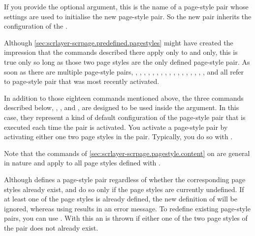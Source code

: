 If you provide the optional  argument, this is the name of
a page-style pair whose settings are used to initialise the new page-style
pair. So the new pair inherits the configuration of the .

Although \autoref{sec:scrlayer-scrpage.predefined.pagestyles} might have
created the impression that the commands described there apply only to
 and  only, this is true
only so long as those two page styles are the only defined page-style pair. As
soon as there are multiple page-style pairs,
, ,
, ,
, ,
, ,
, ,
, ,
, ,
, ,
, and 
all refer to page-style pair that was most recently activated.

In addition to those eighteen commands mentioned above, the three commands
described below, ,
, and
, are designed to be used inside
the  argument. In this case, they represent a kind of
default configuration of the page-style pair that is executed each time the
pair is activated. You activate a page-style pair by activating either one two
page styles in the pair. Typically, you do so with
.

Note that the commands of \autoref{sec:scrlayer-scrpage.pagestyle.content} on
 are general in nature and
apply to all page styles defined with .

Although  defines a page-style pair regardless of
whether the corresponding page styles already exist,
 and  do so only if
the page styles are currently undefined. If at least one of the page styles is
already defined, the new definition of  will be
ignored, whereas using  results in an error
message. To redefine existing page-style pairs, you can use
. With this an is thrown if either one of the two
page styles of the pair does not already exist.%
\EndIndexGroup


